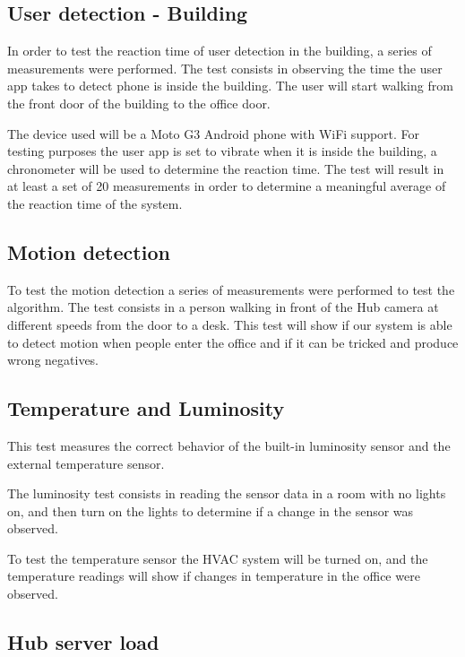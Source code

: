 \subsection{User detection - Building}

In order to test the reaction time of user detection in the building, a series of measurements were performed. The test consists in observing the time the user app takes to detect phone is inside the building. The user will start walking from the front door of the building to the office door.

The device used will be a Moto G3 Android phone with WiFi support.
For testing purposes the user app is set to vibrate when it is inside the building, a chronometer will be used to determine the reaction time. The test will result in at least a set of 20 measurements in order to determine a meaningful average of the reaction time of the system.



\subsection{Motion detection}

To test the motion detection a series of measurements were performed to test the algorithm. The test consists in a person walking in front of the Hub camera at different speeds from the door to a desk. This test will show if our system is able to detect motion when people enter the office and if it can be tricked and produce wrong negatives.




\subsection{Temperature and Luminosity}

This test measures the correct behavior of the built-in luminosity sensor and the external temperature sensor. 

The luminosity test consists in reading the sensor data in a room with no lights on, and then turn on the lights to determine if a change in the sensor was observed.

To test the temperature sensor the \ac{HVAC} system will be turned on, and the temperature readings will show if changes in temperature in the office were observed.


\subsection{Hub server load}


